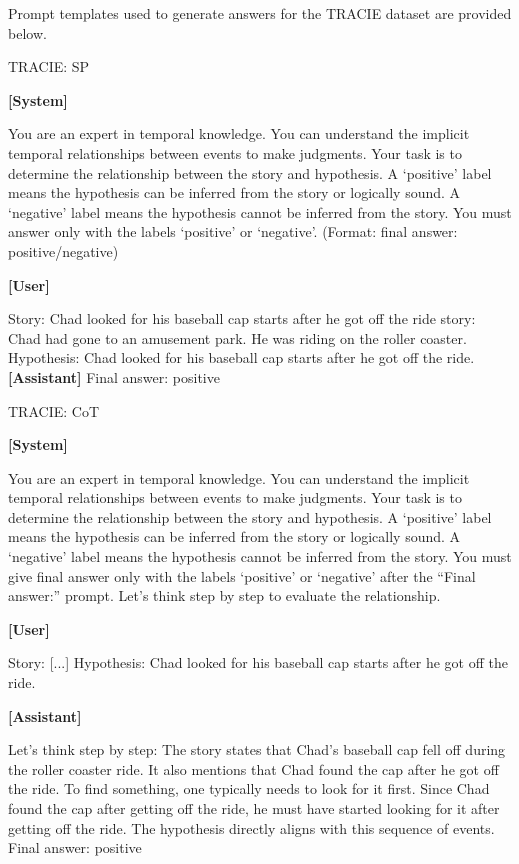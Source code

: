 
Prompt templates used to generate answers for
the TRACIE dataset are provided below.

\begin{myColorbox}[]{TRACIE: SP}

\textbf{[System]}

You are an expert in temporal knowledge. You can understand the implicit temporal relationships between events to make judgments. Your task is to determine the relationship between the story and hypothesis. A `positive' label means the hypothesis can be inferred from the story or logically sound. A `negative' label means the hypothesis cannot be inferred from the story. You must answer only with the labels `positive' or `negative'. (Format: final answer: positive/negative)

\textbf{[User]}

Story: Chad looked for his baseball cap starts after he got off the ride story: Chad had gone to an amusement park. He was riding on the roller coaster. \newline
Hypothesis: Chad looked for his baseball cap starts after he got off the ride.
\newline 
\textbf{[Assistant]}
\newline
Final answer: positive
\end{myColorbox}

\begin{myColorbox}[]{TRACIE: CoT}

\textbf{[System]}

You are an expert in temporal knowledge. You can understand the implicit temporal relationships between events to make judgments. Your task is to determine the relationship between the story and hypothesis. A `positive' label means the hypothesis can be inferred from the story or logically sound. A `negative' label means the hypothesis cannot be inferred from the story. You must give final answer only with the labels `positive' or `negative' after the ``Final answer:'' prompt.
Let's think step by step to evaluate the relationship.

\textbf{[User]}

Story: [...]	\newline
Hypothesis: Chad looked for his baseball cap starts after he got off the ride.

\textbf{[Assistant]}

Let's think step by step: \newline
The story states that Chad's baseball cap fell off during the roller coaster ride.\newline
It also mentions that Chad found the cap after he got off the ride.
To find something, one typically needs to look for it first.
Since Chad found the cap after getting off the ride, he must have started looking for it after getting off the ride.
The hypothesis directly aligns with this sequence of events.
\newline
Final answer: positive

\end{myColorbox}

